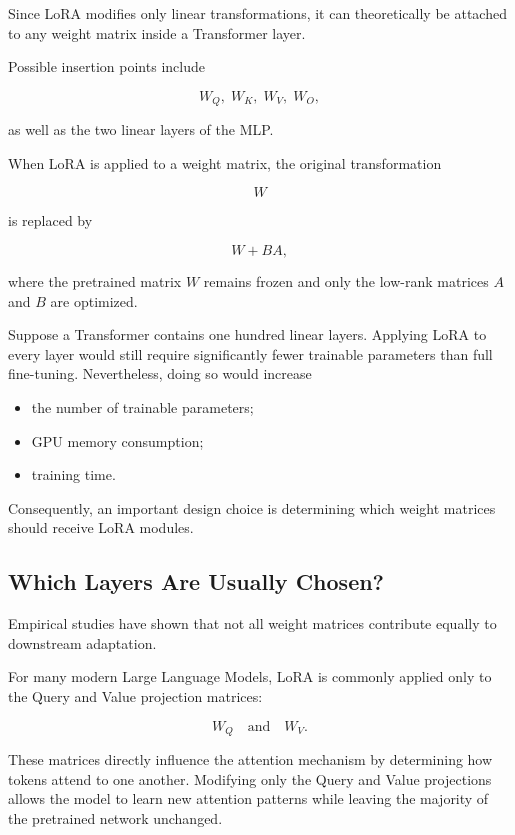 Since LoRA modifies only linear transformations, it can theoretically be attached to any weight matrix inside a Transformer layer.

Possible insertion points include

\[
W_Q,\;
W_K,\;
W_V,\;
W_O,
\]

as well as the two linear layers of the MLP.

When LoRA is applied to a weight matrix, the original transformation

\[
W
\]

is replaced by

\[
W + BA,
\]

where the pretrained matrix $W$ remains frozen and only the low-rank matrices $A$ and $B$ are optimized.

Suppose a Transformer contains one hundred linear layers. Applying LoRA to every layer would still require significantly fewer trainable parameters than full fine-tuning. Nevertheless, doing so would increase

\begin{itemize}
    \item the number of trainable parameters;
    \item GPU memory consumption;
    \item training time.
\end{itemize}

Consequently, an important design choice is determining which weight matrices should receive LoRA modules.
\subsection*{Which Layers Are Usually Chosen?}

Empirical studies have shown that not all weight matrices contribute equally to downstream adaptation.

For many modern Large Language Models, LoRA is commonly applied only to the Query and Value projection matrices:

\[
W_Q
\quad\text{and}\quad
W_V.
\]

These matrices directly influence the attention mechanism by determining how tokens attend to one another. Modifying only the Query and Value projections allows the model to learn new attention patterns while leaving the majority of the pretrained network unchanged.

